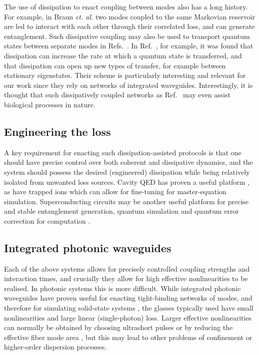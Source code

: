 The use of dissipation to enact coupling between modes also has a long history. For example, in Braun \emph{et. al.} \cite{Braun2002} two modes coupled to the same Markovian reservoir are led to interact with each other through their correlated loss, and can generate entanglement. Such dissipative coupling may also be used to transport quantum states between separate modes in Refs.~\cite{Metelmann2015, Porras2019, Biggerstaff2016, Mogilevtsev2015, Xuereb2018}. In Ref.~\cite{Biggerstaff2016}, for example, it was found that dissipation can increase the rate at which a quantum state is transferred, and that dissipation can open up new types of transfer, for example between stationary eigenstates. Their scheme is particularly interesting and relevant for our work since they rely on networks of integrated waveguides. Interestingly, it is thought that such dissipatively coupled networks as Ref.~\cite{Biggerstaff2016} may even assist biological processes in nature.

\subsection{Engineering the loss}

A key requirement for enacting such dissipation-assisted protocols is that one should have precise control over both coherent and dissipative dynamics, and the system should possess the desired (engineered) dissipation while being relatively isolated from unwanted loss sources. Cavity QED has proven a useful platform \cite{Clark2003}, as have trapped ions \cite{Barreiro2011, Poyatos1996} which can allow for fine-tuning for master-equation simulation. Superconducting circuits may be another useful platform for precise and stable entanglement generation, quantum simulation and quantum error correction for computation \cite{Kimchi-Schwartz2016, Kapit2017}.


\subsection{Integrated photonic waveguides}

Each of the above systems allows for precisely controlled coupling strengths and interaction times, and crucially they allow for high effective nonlinearities to be realised. In photonic systems this is more difficult. While integrated photonic waveguides have proven useful for enacting tight-binding networks of modes, and therefore for simulating solid-state systems \cite{Mukherjee2015, Vicencio2015}, the glasses typically used have small nonlinearities and large linear (single-photon) loss. Larger effective nonlinearities can normally be obtained by choosing ultrashort pulses or by reducing the effective fiber mode area \cite{Agrawal2008, Agrawal2012}, but this may lead to other problems of confinement or higher-order dispersion processes.

